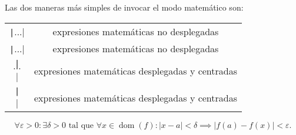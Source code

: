\begin{frame}
	\frametitle{\secname}

	Las dos maneras más simples de invocar el modo matemático son:

	\begin{table}[ht!]
		\centering
		\begin{tabular}{cc}
			\texttt|$...$|                                & expresiones matemáticas no desplegadas          \\
			\texttt|\begin{math}...\end{math}|            & expresiones matemáticas no desplegadas          \\
			\texttt|\[...\]|                              & expresiones matemáticas desplegadas y centradas \\
			\texttt|\begin{displaymath}\end{displaymath}| & expresiones matemáticas desplegadas y centradas \\
		\end{tabular}
	\end{table}

	\begin{equation*}
		\forall\varepsilon>0:\exists\delta>0\text{ tal que }
		\forall x\in\operatorname{dom}\left(f\right):
		\left|x-a\right|<\delta\implies\left|f\left(a\right)-f\left(x\right)\right|<\varepsilon.
	\end{equation*}


\end{frame}
